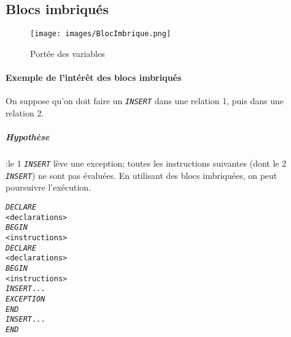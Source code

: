 \documentclass[10pt]{article}
\begin{document}
        \subsection{Blocs imbriqués}
            \begin{figure}[H]
                \begin{center}
                    \texttt{[image: images/BlocImbrique.png]}
                \end{center}
                \caption{Portée des variables}
            \end{figure}


            \paragraph{Exemple de l'intérêt des blocs imbriqués}
                On suppose qu'on doit faire un \emph{\texttt{INSERT}} dans une relation 1, puis dans une relation 2.

                \subparagraph{Hypothèse} :le 1 \emph{\texttt{INSERT}} lève une exception; toutes les instructions suivantes (dont le 2 \emph{\texttt{INSERT}}) ne sont pas évaluées. En utilisant des blocs imbriquées, on peut poursuivre l'exécution.

                \begin{alltt}
                    \begin{tabbing}
                        \emph{DECLARE}\=\\
                            \><declarations>\\
                        \emph{BEGIN}\=\\
                            \><instructions>\\
                            \>\emph{DECLARE}\=\\
                                \>\><declarations>\\
                            \>\emph{BEGIN}\=\\
                                \>\><instructions>\\
                                \>\>\emph{INSERT} ...\\
                            \>\emph{EXCEPTION}\\
                            \>\emph{END}\\
                            \>\emph{INSERT} ... \\
                        \emph{END}
                    \end{tabbing}
                \end{alltt}
\end{document}
